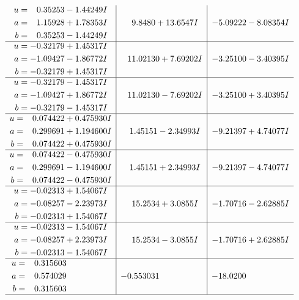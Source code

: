\documentclass[1p]{elsarticle_modified}
\theoremstyle{definition}
\begin{document}
$$\begin{array}{c|c|c}
\begin{aligned}
u &= \phantom{-}0.35253 - 1.44249 I \\
a &= \phantom{-}1.15928 + 1.78353 I \\
b &= \phantom{-}0.35253 - 1.44249 I\end{aligned}
 & \phantom{-}9.8480 + 13.6547 I & -5.09222 - 8.08354 I \\ \hline\begin{aligned}
u &= -0.32179 + 1.45317 I \\
a &= -1.09427 - 1.86772 I \\
b &= -0.32179 + 1.45317 I\end{aligned}
 & \phantom{-}11.02130 + 7.69202 I & -3.25100 - 3.40395 I \\ \hline\begin{aligned}
u &= -0.32179 - 1.45317 I \\
a &= -1.09427 + 1.86772 I \\
b &= -0.32179 - 1.45317 I\end{aligned}
 & \phantom{-}11.02130 - 7.69202 I & -3.25100 + 3.40395 I \\ \hline\begin{aligned}
u &= \phantom{-}0.074422 + 0.475930 I \\
a &= \phantom{-}0.299691 + 1.194600 I \\
b &= \phantom{-}0.074422 + 0.475930 I\end{aligned}
 & \phantom{-}1.45151 - 2.34993 I & -9.21397 + 4.74077 I \\ \hline\begin{aligned}
u &= \phantom{-}0.074422 - 0.475930 I \\
a &= \phantom{-}0.299691 - 1.194600 I \\
b &= \phantom{-}0.074422 - 0.475930 I\end{aligned}
 & \phantom{-}1.45151 + 2.34993 I & -9.21397 - 4.74077 I \\ \hline\begin{aligned}
u &= -0.02313 + 1.54067 I \\
a &= -0.08257 - 2.23973 I \\
b &= -0.02313 + 1.54067 I\end{aligned}
 & \phantom{-}15.2534 + 3.0855 I & -1.70716 - 2.62885 I \\ \hline\begin{aligned}
u &= -0.02313 - 1.54067 I \\
a &= -0.08257 + 2.23973 I \\
b &= -0.02313 - 1.54067 I\end{aligned}
 & \phantom{-}15.2534 - 3.0855 I & -1.70716 + 2.62885 I \\ \hline\begin{aligned}
u &= \phantom{-}0.315603\phantom{ +0.000000I} \\
a &= \phantom{-}0.574029\phantom{ +0.000000I} \\
b &= \phantom{-}0.315603\phantom{ +0.000000I}\end{aligned}
 & -0.553031\phantom{ +0.000000I} & -18.0200\phantom{ +0.000000I}\\
 \hline 
 \end{array}$$\newpage\newpage\renewcommand{\arraystretch}{1}
\end{document}
